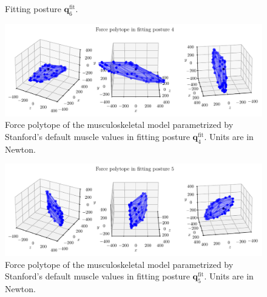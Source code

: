 \begin{figure}[!htb]
\begin{minipage}{0.3\linewidth}
    \end{minipage}
    \caption{Fitting posture $\mathbf{q}_6^{\text{fit}}$.}
    \label{fig:pose_6}
\end{figure}

\clearpage
\begin{figure}[!htb]
    \centering
    \captionsetup{justification=centering}
    \begin{minipage}{\linewidth}
        \centering
        \includegraphics[trim={0 0 0 0}, clip, width=1\linewidth]{img/chapter_4/reconstruction_stanford_imgs/STANFORD_POSTURE_FITTING_04.pdf}
    \end{minipage}
    \caption{Force polytope of the musculoskeletal model parametrized by Stanford's default muscle values in fitting posture $\mathbf{q}_4^{\text{fit}}$. Units are in Newton.}
    \label{fig:polytope_pose_4}
\end{figure}

\begin{figure}[!htb]
    \centering
    \captionsetup{justification=centering}
    \begin{minipage}{\linewidth}
        \centering
        \includegraphics[trim={0 0 0 0}, clip, width=1\linewidth]{img/chapter_4/reconstruction_stanford_imgs/STANFORD_POSTURE_FITTING_05.pdf}
    \end{minipage}
    \caption{Force polytope of the musculoskeletal model parametrized by Stanford's default muscle values in fitting posture $\mathbf{q}_5^{\text{fit}}$. Units are in Newton.}
    \label{fig:polytope_pose_5}
\end{figure}

